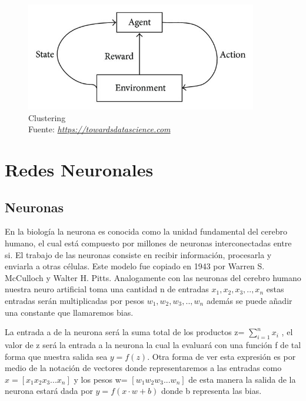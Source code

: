 \begin{figure}[H]
	\centering
	\includegraphics[width=0.9\textwidth]{Figures/esquema.jpeg}
	\caption{Clustering \\ Fuente:  \href{https://towardsdatascience.com/types-of-machine-learning-algorithms-you-should-know-953a08248861}{\textit{https://towardsdatascience.com}}}
	\label{Clustering}
\end{figure} 


\section{Redes Neuronales}
\subsection*{Neuronas}
En la biología la neurona es conocida como la unidad fundamental del cerebro humano, el cual está compuesto por millones de neuronas interconectadas entre si. El trabajo de las neuronas consiste en recibir información, procesarla y enviarla a otras células. Este modelo fue copiado en 1943 por Warren S. McCulloch y Walter H. Pitts. Analogamente con las neuronas del cerebro humano nuestra neuro artificial toma una cantidad n de entradas $x_{1}, x_{2}, x_{3}, .. , x_{n}$ estas entradas serán multiplicadas por pesos $w_{1}, w_{2}, w_{3}, .. , w_{n}$ además se puede añadir una constante que llamaremos bias. 

La entrada a de la neurona será la suma total de los productos z=  $\sum_{i=1}^{n}x_{i}$ , el valor de z será la entrada a la neurona la cual la evaluará con una función f de tal forma que nuestra salida sea $y=f(z)$. Otra forma de ver esta expresión es por medio de la notación de vectores donde representaremos a las entradas como $x= [x_{1}  x_{2}  x_{3}  ...  x_{n}]$ y los pesos w= $[w_{1}  w_{2}  w_{3}  ...  w_{n}]$ de esta manera la salida de la neurona estará dada por $y=f(x\cdot w+b)$ donde b representa las bias. 

